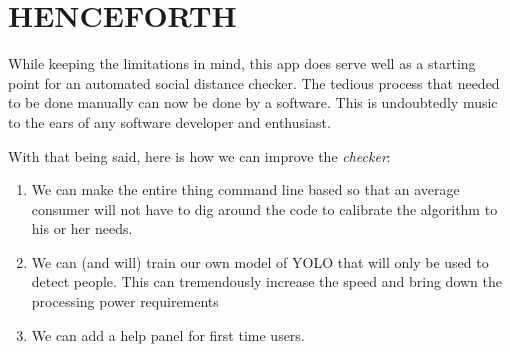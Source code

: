\documentclass[a4paper]{article}
\begin{document}
\section{HENCEFORTH}

While keeping the limitations in mind, this app does serve well as a starting point for an automated social distance checker. The tedious process that needed to be done manually can now be done by a software. This is undoubtedly music to the ears of any software developer and enthusiast.

With that being said, here is how we can improve the \textit{checker}:

\begin{enumerate}
    \item We can make the entire thing command line based so that an average consumer will not have to dig around the code to calibrate the algorithm to his or her needs.
    \item We can (and will) train our own model of YOLO that will only be used to detect people. This can tremendously increase the speed and bring down the processing power requirements
    \item We can add a help panel for first time users.
\end{enumerate}



\end{document}
